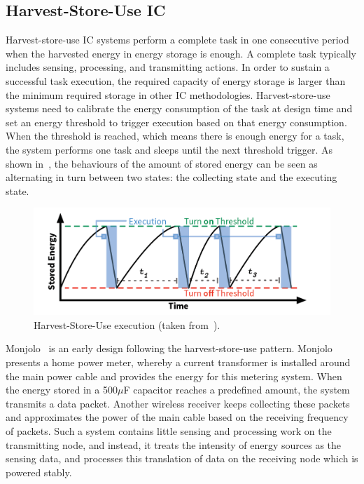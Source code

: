 \subsection{Harvest-Store-Use IC}

Harvest-store-use IC systems perform a complete task in one consecutive period when the harvested energy in energy storage is enough. A complete task typically includes sensing, processing, and transmitting actions. In order to sustain a successful task execution, the required capacity of energy storage is larger than the minimum required storage in other IC methodologies. Harvest-store-use systems need to calibrate the energy consumption of the task at design time and set an energy threshold to trigger execution based on that energy consumption. When the threshold is reached, which means there is enough energy for a task, the system performs one task and sleeps until the next threshold trigger. As shown in~, the behaviours of the amount of stored energy can be seen as alternating in turn between two states: the collecting state and the executing state.

\begin{figure}
    \centering
    \includegraphics[width=\columnwidth]{ch2_review/figures/saveanduse}
    \caption{Harvest-Store-Use execution (taken from~\cite{hester2017new}).}
    \label{Figure:saveanduse}
\end{figure}

Monjolo~\cite{debruin2013monjolo} is an early design following the harvest-store-use pattern. Monjolo presents a home power meter, whereby a current transformer is installed around the main power cable and provides the energy for this metering system. When the energy stored in a 500$\mu$F capacitor reaches a predefined amount, the system transmits a data packet. Another wireless receiver keeps collecting these packets and approximates the power of the main cable based on the receiving frequency of packets. Such a system contains little sensing and processing work on the transmitting node, and instead, it treats the intensity of energy sources as the sensing data, and processes this translation of data on the receiving node which is powered stably.

